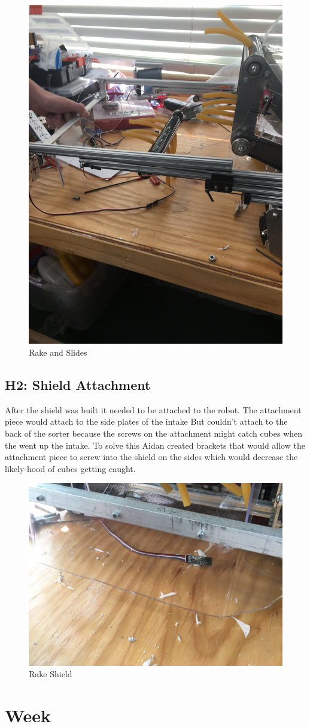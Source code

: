 \documentclass{article}
\begin{document}
\begin{figure}
    \centering
    \includegraphics[width=.6 \textwidth, angle=-90 ]{11_11-12/images/rake_slides.JPG}
    \caption{Rake and Slides}
    \label{fig:Intake CAD}
\end{figure}

\subsection{H2: Shield Attachment}

After the shield was built it needed to be attached to the robot. The attachment piece would attach to the side plates of the intake But couldn't attach to the back of the sorter because the screws on the attachment might catch cubes when the went up the intake. To solve this Aidan created brackets that would allow the attachment piece to screw into the shield on the sides which would decrease the likely-hood of cubes getting caught.

\begin{figure}
    \centering
    \includegraphics[width=.6 \textwidth]{11_11-12/images/rake.jpg}
    \caption{Rake Shield}
    \label{fig:rakeshield}
\end{figure}\clearpage \newpage \section{Week \thesection} 
\end{document}
